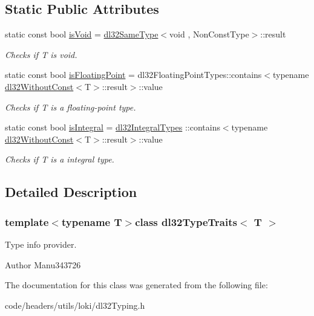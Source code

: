 \subsection*{Static Public Attributes}
\begin{DoxyCompactItemize}
\item 
\hypertarget{classdl32_type_traits_ab98ad8b500f118677135ea4e5188b5d4}{static const bool \hyperlink{classdl32_type_traits_ab98ad8b500f118677135ea4e5188b5d4}{is\-Void} = \hyperlink{classdl32_same_type}{dl32\-Same\-Type}$<$void , Non\-Const\-Type$>$\-::result}\label{classdl32_type_traits_ab98ad8b500f118677135ea4e5188b5d4}

\begin{DoxyCompactList}\small\item\em Checks if T is void. \end{DoxyCompactList}\item 
\hypertarget{classdl32_type_traits_abee216e978de1d39aa42ae3cf2683747}{static const bool \hyperlink{classdl32_type_traits_abee216e978de1d39aa42ae3cf2683747}{is\-Floating\-Point} = dl32\-Floating\-Point\-Types\-::contains$<$typename \hyperlink{classdl32_without_const}{dl32\-Without\-Const}$<$T$>$\-::result$>$\-::value}\label{classdl32_type_traits_abee216e978de1d39aa42ae3cf2683747}

\begin{DoxyCompactList}\small\item\em Checks if T is a floating-\/point type. \end{DoxyCompactList}\item 
\hypertarget{classdl32_type_traits_ae0546624a6731e74fe1169d30bb3e68d}{static const bool \hyperlink{classdl32_type_traits_ae0546624a6731e74fe1169d30bb3e68d}{is\-Integral} = \hyperlink{structdl32_type_list}{dl32\-Integral\-Types} \-::contains$<$typename \hyperlink{classdl32_without_const}{dl32\-Without\-Const}$<$T$>$\-::result$>$\-::value}\label{classdl32_type_traits_ae0546624a6731e74fe1169d30bb3e68d}

\begin{DoxyCompactList}\small\item\em Checks if T is a integral type. \end{DoxyCompactList}\end{DoxyCompactItemize}


\subsection{Detailed Description}
\subsubsection*{template$<$typename T$>$class dl32\-Type\-Traits$<$ T $>$}

Type info provider. 

\begin{DoxyAuthor}{Author}
Manu343726 
\end{DoxyAuthor}


The documentation for this class was generated from the following file\-:\begin{DoxyCompactItemize}
\item 
code/headers/utils/loki/dl32\-Typing.\-h\end{DoxyCompactItemize}
